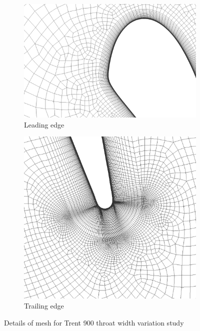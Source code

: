 \documentclass[a4paper, 11pt, oneside]{report}
\begin{document}
\begin{figure}[H]
	\centering
	\begin{subfigure}{.45\textwidth}
		\centering
		\includegraphics[width=\linewidth]{figs/t900_mesh_leading_edge.png}
		\caption{Leading edge}
		\label{fig:t900_mesh_leading_edge}
	\end{subfigure}
	\hspace{0.05\textwidth}
	\begin{subfigure}{.45\textwidth}
		\centering
		\includegraphics[width=\linewidth]{figs/t900_mesh_trailing_edge.png}
		\caption{Trailing edge}
		\label{fig:t900_mesh_trailing_edge}
	\end{subfigure}
	\caption{Details of mesh for Trent 900 throat width variation study}
	\label{fig:t900_mesh_details}
\end{figure}
\end{document}
